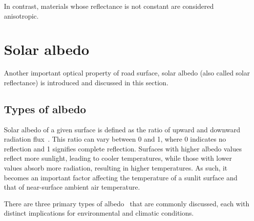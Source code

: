 In contrast, materials whose reflectance is not constant are considered anisotropic.


\section{Solar albedo}

Another important optical property of road surface, solar albedo (also called solar reflectance) is introduced and discussed in this section.


\subsection{Types of albedo}

Solar albedo of a given surface is defined as the ratio of upward and downward radiation flux~\cite{2015_Qu,2019_Chen}.
This ratio can vary between 0 and 1, where 0 indicates no reflection and 1 signifies complete reflection.
Surfaces with higher albedo values reflect more sunlight, leading to cooler temperatures, while those with lower values absorb more radiation, resulting in higher temperatures.
As such, it becomes an important factor affecting the temperature of a sunlit surface and that of near-surface ambient air temperature.

There are three primary types of albedo~\cite{2015_Qu} that are commonly discussed, each with distinct implications for environmental and climatic conditions.

